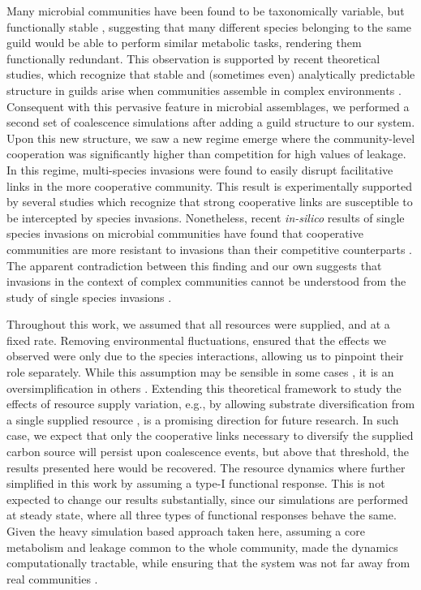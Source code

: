 \documentclass[10pt,letterpaper]{article}
\begin{document}
Many microbial communities have been found to be taxonomically variable, but functionally stable \cite{Louca2018, Enke2019}, suggesting that many different species belonging to the same guild would be able to perform similar metabolic tasks, rendering them functionally redundant. This observation is supported by recent theoretical studies, which recognize that stable and (sometimes even) analytically predictable structure in guilds arise when communities assemble in complex environments \cite{Goldford2018, Marsland2019, Marsland2020, Fant2021}. Consequent with this pervasive feature in microbial assemblages, we performed a second set of coalescence simulations after adding a guild structure to our system. Upon this new structure, we saw a new regime emerge where the community-level cooperation was significantly higher than competition for high values of leakage. In this regime, multi-species invasions were found to easily disrupt facilitative links in the more cooperative community. This result is experimentally supported by several studies \cite{Altieri2010, Li2019, Machado} which recognize that strong cooperative links are susceptible to be intercepted by species invasions. Nonetheless, recent \textit{in-silico} results of single species invasions on microbial communities have found that cooperative communities are more resistant to invasions than their competitive counterparts \cite{Kurkjian2021}. The apparent contradiction between this finding and our own suggests that invasions in the context of complex communities  cannot be understood from the study of single species invasions \cite{Sierocinki2021}.

Throughout this work, we assumed that all resources were supplied, and at a fixed rate. Removing environmental fluctuations, ensured that the effects we observed were only due to the species interactions, allowing us to pinpoint their role separately. While this assumption may be sensible in some cases \cite{Acosta2015}, it is an oversimplification in others \cite{Albright2020}. Extending this theoretical framework to study the effects of resource supply variation, e.g., by allowing substrate diversification from a single supplied resource \cite{Goldford2018, Marsland2019}, is a promising direction for future research. In such case, we expect that only the cooperative links necessary to diversify the supplied carbon source will persist upon coalescence events, but above that threshold, the results presented here would be recovered. The resource dynamics where further simplified in this work by assuming a type-I functional response. This is not expected to change our results substantially, since our simulations are performed at steady state, where all three types of functional responses behave the same. Given the heavy simulation based approach taken here, assuming a core metabolism and leakage common to the whole community, made the dynamics computationally tractable, while ensuring that the system was not far away from real communities \cite{Marsland2019, Marsland2020}.
\end{document}

